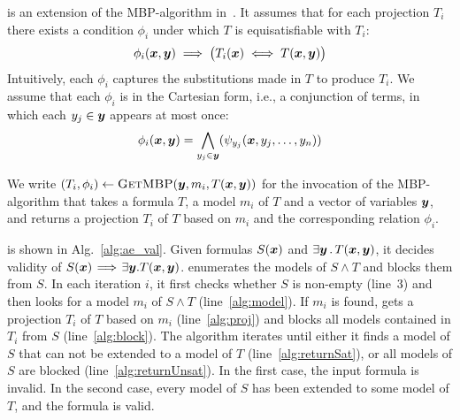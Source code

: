 \aeval is an extension of the MBP-algorithm in~\cite{komuravelli2014smt}.
It assumes that for each projection $T_{i}$ there exists a condition $\phi_i$ under which  $T$ is equisatisfiable with $T_{i}$:
\begin{equation}
\label{eq:phi}
\phi_i(\vx,\vy) \implies \big( T_{i}(\vx) \iff T(\vx,\vy) \big)
\end{equation}
Intuitively, each $\phi_i$ captures the substitutions made in $T$ to produce $T_{i}$.
We assume that each $\phi_i$ is in the Cartesian form, i.e., a conjunction of
terms, in which each $y_j \in \vy$ appears at most once:
\begin{equation}
\label{eq:phi_conj}
\phi_i(\vx,\vy) = \Land_{y_j \in \vy}(\psi_{y_j}(\vx,y_{j},\ldots,y_{n}))
\end{equation}

      \aevalalgorithm  


We write $(T_{i}, \phi_i) \gets
\textsc{GetMBP} (\vy, m_i, T(\vx, \vy))$ for the invocation of the MBP-algorithm that takes
a formula $T$, a model $m_i$ of $T$ and a vector of variables $\vy$,
and returns a projection $T_{i}$ of $T$ based on $m_i$ and the corresponding
relation $\phi_i$.


\aeval is shown in Alg.~\ref{alg:ae_val}.  Given formulas
$S(\vx)$ and ${\exists \vy \such T(\vx, \vy)}$, it
decides validity of ${S(\vx)\! \implies\! \exists \vy \!\such\!
  T(\vx, \vy)}$.  \aeval enumerates the
models of $S \land T$ and blocks them from $S$.
In each iteration $i$, it first checks whether
$S$ is non-empty (line~3) and then looks for a model $m_i$ of $S
\land T$ (line~\ref{alg:model}).  If $m_i$ is found, \aeval
gets a projection $T_i$ of $T$ based on $m_i$ (line~\ref{alg:proj})
and blocks all models contained in $T_i$ from $S$
(line~\ref{alg:block}).  The algorithm iterates until either it
finds a model of $S$ that can not be extended to a
model of $T$ (line~\ref{alg:returnSat}), or all models of $S$
are blocked (line~\ref{alg:returnUnsat}). In the first case, the input
formula is invalid. In the second case, every model of $S$ has been extended
to some model of $T$, and the  formula is valid. 

\newcommand{\skolemcases}{%
\begin{equation}
\label{case:skolem}
\mathit{Sk}_{\vy} (\vx, \vy) \equiv
\begin{cases}
  \phi_{1} (\vx, \vy)  & \text{if } T_1 (\vx) \\
    \phi_{2} (\vx, \vy)  & \text{else if } T_2 (\vx)\\
  \cdots &\text{\qquad else }\cdots \\
  \phi_{n} (\vx, \vy) & \text{\qquad\qquad else } T_n (\vx) \\
\end{cases}
\end{equation}
}

